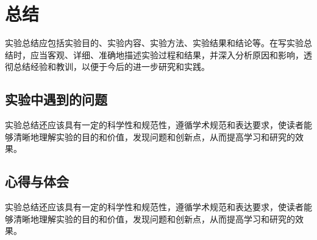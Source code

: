 \chapter{总结}
实验总结应包括实验目的、实验内容、实验方法、实验结果和结论等。在写实验总结时，应当客观、详细、准确地描述实验过程和结果，并深入分析原因和影响，透彻总结经验和教训，以便于今后的进一步研究和实践。
\section{实验中遇到的问题}
实验总结还应该具有一定的科学性和规范性，遵循学术规范和表达要求，使读者能够清晰地理解实验的目的和价值，发现问题和创新点，从而提高学习和研究的效果。

\section{心得与体会}
实验总结还应该具有一定的科学性和规范性，遵循学术规范和表达要求，使读者能够清晰地理解实验的目的和价值，发现问题和创新点，从而提高学习和研究的效果。